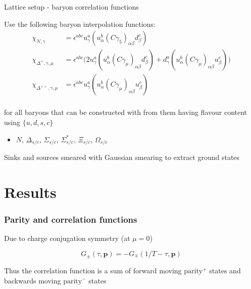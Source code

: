 \documentclass[11pt]{beamer}
\begin{document}
\begin{frame}{Lattice setup - baryon correlation functions}

  Use the following baryon interpolation functions:
  \begin{align*}
    \chi_{N,\gamma} &= \epsilon^{abc} u^{a}_\gamma (u^b_{\alpha} (C \gamma_5)_{\alpha\beta} d^c_{\beta}) \\
    \chi_{\Delta^+,\gamma,\mu} &= \epsilon^{abc} \big( %
      2 u^{a}_\gamma (u^b_{\alpha} (C \gamma_{\mu})_{\alpha\beta} d^c_{\beta}) + %
    d^{a}_\gamma (u^b_{\alpha} (C \gamma_{\mu})_{\alpha\beta} u^c_{\beta})\big) \\
    \chi_{\Delta^{++},\gamma,\mu} &= \epsilon^{abc} u^{a}_\gamma (u^b_{\alpha} (C \gamma_{\mu})_{\alpha\beta} u^c_{\beta}) \\
  \end{align*}

  \vspace*{-8mm}

  for all baryons that can be constructed with from them having flavour content
  using $\{u, d, s, c\}$

  \begin{itemize}
    \item $N$, $\Delta_{s/c}$, $\Sigma_{s/c}$, $\Sigma^*_{s/c}$, $\Xi_{s/c}$, $\Omega_{s/c}$
  \end{itemize}

  Sinks and sources smeared with Gaussian smearing to extract ground states

\end{frame}

\section{Results}

\begin{frame}
  \frametitle{Parity and correlation functions}

  Due to charge conjugation symmetry (at $\mu = 0$)

  \begin{equation*}
    G_{\pm}(\tau, \mathbf{p}) = - G_{\mp}(1/T - \tau, \mathbf{p})
  \end{equation*}

  Thus the correlation function is a sum of forward moving
  $\text{parity}^+$ states and backwards moving $\text{parity}^-$ states

\end{frame}
\end{document}
